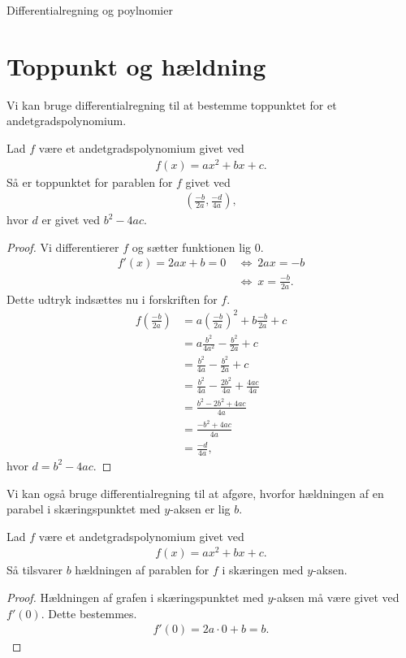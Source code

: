 
\begin{center}
\Huge
Differentialregning og poylnomier
\end{center}

\section*{Toppunkt og hældning}

Vi kan bruge differentialregning til at bestemme toppunktet for et andetgradspolynomium.
\begin{setn}[Toppunktsformlen]
	Lad $f$ være et andetgradspolynomium givet ved
	\begin{align*}
		f(x) = ax^2+bx+c.
	\end{align*}
	Så er toppunktet for parablen for $f$ givet ved
	\begin{align*}
		\left(\frac{-b}{2a},\frac{-d}{4a} \right),
	\end{align*}
	hvor $d$ er givet ved $b^2-4ac$.
\end{setn}
\begin{proof}
	Vi differentierer $f$ og sætter funktionen lig $0$. 
	\begin{align*}
		f'(x) = 2ax+b=0 \ &\Leftrightarrow \ 2ax = -b \\
		&\Leftrightarrow \ x = \frac{-b}{2a}.
	\end{align*}
	Dette udtryk indsættes nu i forskriften for $f$.
	\begin{align*}
		f\left( \frac{-b}{2a}\right) &= a\left(\frac{-b}{2a}\right)^2 + b\frac{-b}{2a} + c\\
		&= a \frac{b^2}{4a^2} - \frac{b^2}{2a} + c \\
		&= \frac{b^2}{4a} - \frac{b^2}{2a} + c \\
		&= \frac{b^2}{4a} - \frac{2b^2}{4a} + \frac{4ac}{4a} \\
		&= \frac{b^2 - 2b^2 + 4ac}{4a} \\
		&= \frac{-b^2 + 4ac}{4a} \\
		&= \frac{-d}{4a},
	\end{align*}
	hvor $d=b^2-4ac$.
\end{proof}
Vi kan også bruge differentialregning til at afgøre, hvorfor hældningen af en parabel i skæringspunktet med $y$-aksen er lig $b$.
\begin{setn}
	Lad $f$ være et andetgradspolynomium givet ved
	\begin{align*}
		f(x) = ax^2+bx+c.
	\end{align*}
	Så tilsvarer $b$ hældningen af parablen for $f$ i skæringen med $y$-aksen. 
\end{setn}
\begin{proof}
	Hældningen af grafen i skæringspunktet med $y$-aksen må være givet ved $f'(0)$. Dette bestemmes.
	\begin{align*}
		f'(0) = 2a\cdot 0 + b = b.
	\end{align*}
\end{proof}


